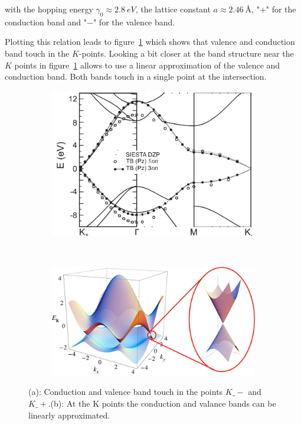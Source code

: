 with the hopping energy $\gamma_0\approx\SI{2.8}{eV}$, the lattice constant $a\approx\SI{2.46}{Å}$, "$+$" for the conduction band and "$-$" for the valence band.

Plotting this relation leads to figure~\ref{fig:bands} which shows that valence and conduction band touch in the $K$-points. Looking a bit closer at the band structure near the $K$ points in figure~\ref{fig:bands} allows to use a linear approximation of the valence and conduction band. Both bands touch in a single point at the intersection.

\begin{figure}[!h]
  \centering
  \begin{subfigure}[b]{0.4\textwidth}
    \caption{}
    \includegraphics[width=\textwidth]{./images/band-2d.png}
  \end{subfigure}
  ~
  \begin{subfigure}[b]{0.4\textwidth}
    \caption{}
    \includegraphics[width=\textwidth]{./images/dispersion.png}
  \end{subfigure}
  \caption { (a): Conduction and valence band touch in the points $K\_-$ and $K\_+$.\mcite (b): At the K points the conduction and valance bands can be linearly approximated.\mcite }
  \label{fig:bands}
\end{figure}

